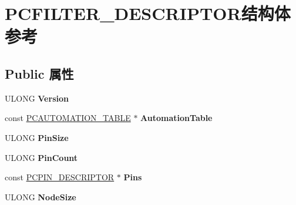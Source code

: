 \hypertarget{struct_p_c_f_i_l_t_e_r___d_e_s_c_r_i_p_t_o_r}{}\section{P\+C\+F\+I\+L\+T\+E\+R\+\_\+\+D\+E\+S\+C\+R\+I\+P\+T\+O\+R结构体 参考}
\label{struct_p_c_f_i_l_t_e_r___d_e_s_c_r_i_p_t_o_r}
\subsection*{Public 属性}
\begin{DoxyCompactItemize}
\item 
\mbox{\label{struct_p_c_f_i_l_t_e_r___d_e_s_c_r_i_p_t_o_r_a1db7dfcd55838f9720ca219a4da1a73d}} 
U\+L\+O\+NG {\bfseries Version}
\item 
\mbox{\label{struct_p_c_f_i_l_t_e_r___d_e_s_c_r_i_p_t_o_r_ac474a3ce588523737582bba34796d36e}} 
const \hyperlink{struct_p_c_a_u_t_o_m_a_t_i_o_n___t_a_b_l_e}{P\+C\+A\+U\+T\+O\+M\+A\+T\+I\+O\+N\+\_\+\+T\+A\+B\+LE} $\ast$ {\bfseries Automation\+Table}
\item 
\mbox{\label{struct_p_c_f_i_l_t_e_r___d_e_s_c_r_i_p_t_o_r_a87aaab90661f80203d2c487b09c9bfc1}} 
U\+L\+O\+NG {\bfseries Pin\+Size}
\item 
\mbox{\label{struct_p_c_f_i_l_t_e_r___d_e_s_c_r_i_p_t_o_r_ac32389ea0936f1359c6c3d8babcd1c9c}} 
U\+L\+O\+NG {\bfseries Pin\+Count}
\item 
\mbox{\label{struct_p_c_f_i_l_t_e_r___d_e_s_c_r_i_p_t_o_r_a6d3d0eaf2f189da59e512eb278679175}} 
const \hyperlink{struct_p_c_p_i_n___d_e_s_c_r_i_p_t_o_r}{P\+C\+P\+I\+N\+\_\+\+D\+E\+S\+C\+R\+I\+P\+T\+OR} $\ast$ {\bfseries Pins}
\item 
\mbox{\label{struct_p_c_f_i_l_t_e_r___d_e_s_c_r_i_p_t_o_r_a5abdf9ff38684cfd7221ae05270f29b6}} 
U\+L\+O\+NG {\bfseries Node\+Size}
\item 
\mbox{\label{struct_p_c_f_i_l_t_e_r___d_e_s_c_r_i_p_t_o_r_a71b7a4ae6422059265c00e9c810435c3}} 

\end{DoxyCompactItemize}
